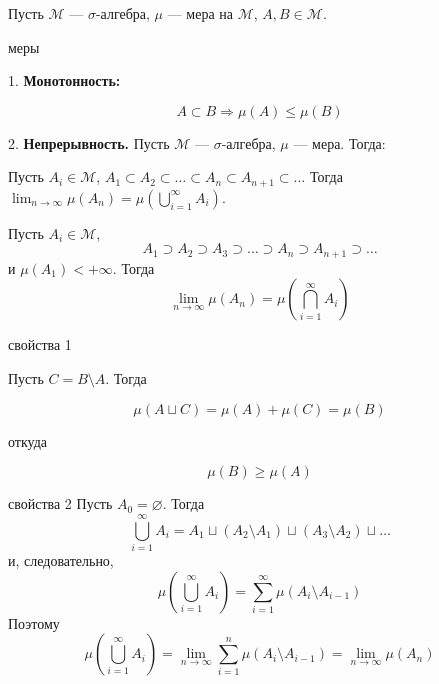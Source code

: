 \documentclass[12pt,a4paper]{article}
\begin{document}
Пусть $\mathcal{M}$ --- $\sigma$-алгебра, $\mu$ --- мера на $\mathcal{M}$, $A,B\in\mathcal{M}$.

\begin{props}{меры}

    1. \textbf{Монотонность:}

    \[
        A\subset B \Longrightarrow \mu(A)\leq\mu(B)
    \]


    2. \textbf{Непрерывность.} Пусть $\mathcal{M}$ --- $\sigma$-алгебра, $\mu$ --- мера. Тогда:

    Пусть $A_i\in\mathcal{M}$,
    \(    A_1\subset A_2\subset\ldots\subset A_n\subset A_{n+1}\subset\ldots
    \)
    Тогда
    \(    \lim_{n\to\infty}\mu(A_n)
    =
    \mu\left(\bigcup_{i=1}^{\infty}A_i\right).
    \)


    Пусть $A_i\in\mathcal{M}$,
    \[
        A_1\supset A_2\supset A_3\supset\ldots\supset A_n\supset A_{n+1}\supset\ldots
    \]
    и $\mu(A_1)<+\infty$. Тогда
    \[
        \lim_{n\to\infty}\mu(A_n)
        =
        \mu\left(\bigcap_{i=1}^{\infty}A_i\right)
    \]

\end{props}

\begin{proofbox}{свойства 1}

    Пусть $C=B\setminus A$. Тогда

    \[
        \mu(A\sqcup C)=\mu(A)+\mu(C)=\mu(B)
    \]

    откуда

    \[
        \mu(B)\geq\mu(A)
    \]

\end{proofbox}

\begin{proofbox}{свойства 2}
    Пусть $A_0=\varnothing$. Тогда
    \[
        \bigcup_{i=1}^{\infty}A_i
        =
        A_1\sqcup(A_2\setminus A_1)\sqcup(A_3\setminus A_2)\sqcup\ldots
    \]
    и, следовательно,
    \[
        \mu\left(\bigcup_{i=1}^{\infty}A_i\right)
        =
        \sum_{i=1}^{\infty}\mu(A_i\setminus A_{i-1})
    \]
    Поэтому
    \[
        \mu\left(\bigcup_{i=1}^{\infty}A_i\right)
        =
        \lim_{n\to\infty}
        \sum_{i=1}^{n}\mu(A_i\setminus A_{i-1})
        =
        \lim_{n\to\infty}\mu(A_n)
    \]
\end{proofbox}
\end{document}
